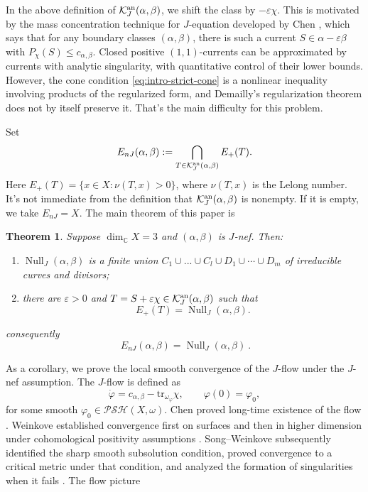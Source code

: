 \documentclass[reqno]{amsart}
\theoremstyle{remark}
\def\C{\mathbb{C}}
\def\tr{\text{tr}}
\newcommand{\JNull}{\operatorname{Null}_{J}}
\newcommand{\JEnK}{E_{nJ}}
\newcommand{\Psh}{\mathcal{PSH}}
\newcommand{\cab}{c_{\alpha,\beta}}
\def\cK{{\mathcal K}}
\theoremstyle{plain}
\newtheorem{thm}{Theorem}
\begin{document}
In the above definition of $\cK_J^{\rm an}(\alpha,\beta)$, we shift the class by $-\varepsilon\chi$. This is motivated by the mass concentration technique for $J$-equation developed by Chen \cite{C21}, which says that for any boundary classes $(\alpha,\beta)$, there is such a current $S\in \alpha-\varepsilon\beta$ with $P_\chi
(S)\leq \cab.$ Closed positive
$(1,1)$-currents can be approximated by currents with analytic singularity, with quantitative control of
their lower bounds.  However, the cone condition \eqref{eq:intro-strict-cone} is a
nonlinear inequality involving products of the regularized form, and
Demailly's regularization theorem does not by itself preserve it. That's the main difficulty for this problem. 

Set \[
\JEnK(\alpha,\beta)
 :=\bigcap_{T\in\mathcal K^{\rm an}_J(\alpha,\beta)}E_+(T).
\]
Here $E_+(T)=\{x\in X:\nu(T,x)>0\}$, where $\nu(T,x)$ is the Lelong number.  
It's not immediate from the definition that $\cK_{J}^{\rm an}(\alpha,\beta)$ is nonempty. If it is empty, we take $\JEnK=X$.
The main theorem of this paper is
\begin{thm}\label{thm:main-thm}Suppose $\dim_\C X=3$ and $(\alpha,\beta)$ is $J$-nef. Then:\begin{enumerate}
    \item $\JNull(\alpha,\beta)$ is a finite union
      $C_1\cup...\cup C_l\cup D_1\cup\cdots\cup D_m$ of irreducible curves and divisors;
\item there are $\varepsilon>0$ and
      $T=S+\varepsilon\chi\in\mathcal K^{\rm an}_J(\alpha,\beta)$
      such that
      \[
        E_+(T)=\JNull(\alpha,\beta).
      \]
\end{enumerate}
consequently
      \[\ \JEnK(\alpha,\beta)=\JNull(\alpha,\beta)\ .\]
\end{thm}
As a corollary, we prove the local smooth convergence of the $J$-flow under the $J$- nef assumption. The $J$-flow is defined as \begin{equation}
    \label{eq:J-flow}\dot\varphi=\cab-\tr_{\omega_\varphi}\chi, \qquad \varphi(0)=\varphi_0,
\end{equation}for some smooth $\varphi_0\in \Psh(X,\omega).$ Chen proved long-time existence of the flow \cite{C04}.  Weinkove
established convergence first on surfaces and then in higher dimension
under cohomological positivity assumptions
\cite{W04,W06}.  Song--Weinkove subsequently
identified the sharp smooth subsolution condition, proved convergence
to a critical metric under that condition, and analyzed the formation
of singularities when it fails \cite{SW08}.  The flow picture
\end{document}
